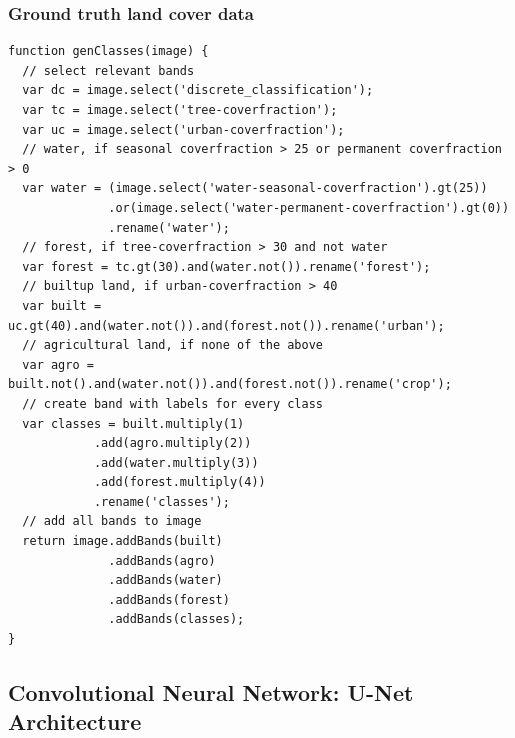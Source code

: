 \documentclass[12pt, a4paper]{report}
\begin{document}
\subsubsection*{Ground truth land cover data}
\begin{verbatim}
function genClasses(image) {
  // select relevant bands
  var dc = image.select('discrete_classification');
  var tc = image.select('tree-coverfraction');
  var uc = image.select('urban-coverfraction');
  // water, if seasonal coverfraction > 25 or permanent coverfraction > 0
  var water = (image.select('water-seasonal-coverfraction').gt(25))
              .or(image.select('water-permanent-coverfraction').gt(0))
              .rename('water');
  // forest, if tree-coverfraction > 30 and not water
  var forest = tc.gt(30).and(water.not()).rename('forest');
  // builtup land, if urban-coverfraction > 40
  var built = uc.gt(40).and(water.not()).and(forest.not()).rename('urban');
  // agricultural land, if none of the above
  var agro = built.not().and(water.not()).and(forest.not()).rename('crop');
  // create band with labels for every class
  var classes = built.multiply(1)
			.add(agro.multiply(2))
			.add(water.multiply(3))
			.add(forest.multiply(4))
			.rename('classes');
  // add all bands to image
  return image.addBands(built)
              .addBands(agro)
              .addBands(water)
              .addBands(forest)
              .addBands(classes);
}
\end{verbatim}

\subsection*{Convolutional Neural Network: U-Net Architecture}
\end{document}
